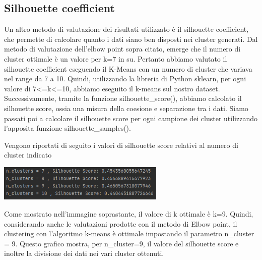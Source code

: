 \documentclass[a4paper, 10pt]{report}
\begin{document}
            \subsection{Silhouette coefficient}
                Un altro metodo di valutazione dei risultati utilizzato è il silhouette coefficient, che permette di calcolare
                quanto i dati siano ben disposti nei cluster generati.
                Dal metodo di valutazione dell'elbow point sopra citato, emerge che il numero di cluster ottimale è un valore
                per k=7 in su.
                Pertanto abbiamo valutato il silhouette coefficient eseguendo il K-Means con un numero di cluster che variava
                nel range da 7 a 10.
                Quindi, utilizzando la libreria di Python sklearn, per ogni valore di 7<=k<=10, abbiamo eseguito il k-means sul
                nostro dataset. Successivamente, tramite la funzione silhouette\_{}score(), abbiamo calcolato il silhouette score,
                ossia una misura della coesione e separazione tra i dati.
                Siamo passati poi a calcolare il silhouette score per ogni campione dei cluster utilizzando l'apposita funzione
                silhouette\_{}samples().

                Vengono riportati di seguito i valori di silhouette score relativi al numero di cluster indicato

                \begin{center}
                    \includegraphics[width=8cm]{evaluation/silhouette score}\\
                \end{center}

                Come mostrato nell'immagine soprastante, il valore di k ottimale è k=9. Quindi, considerando anche le valutazioni
                prodotte con il metodo di Elbow point, il clustering con l'algoritmo k-means è ottimale impostando il parametro
                n\_{}cluster = 9. Questo grafico mostra, per n\_{}cluster=9, il valore del silhouette score e inoltre la divisione
                dei dati nei vari cluster ottenuti.
\end{document}
